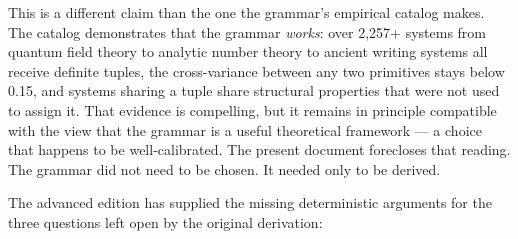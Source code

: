 \documentclass[12pt,a4paper]{article}
\begin{document}
This is a different claim than the one the grammar's empirical catalog makes. The catalog demonstrates that the grammar \emph{works}: over 2,257+ systems from quantum field theory to analytic number theory to ancient writing systems all receive definite tuples, the cross-variance between any two primitives stays below 0.15, and systems sharing a tuple share structural properties that were not used to assign it. That evidence is compelling, but it remains in principle compatible with the view that the grammar is a useful theoretical framework --- a choice that happens to be well-calibrated. The present document forecloses that reading. The grammar did not need to be chosen. It needed only to be derived.

The advanced edition has supplied the missing deterministic arguments for the three questions left open by the original derivation:
\end{document}
